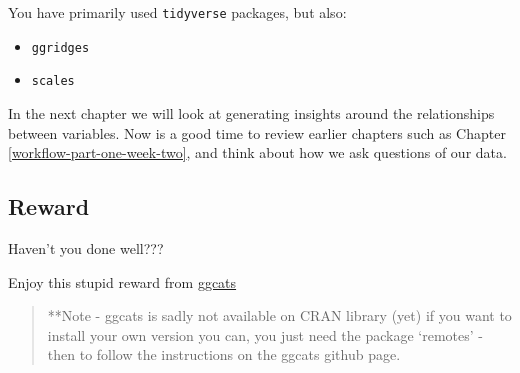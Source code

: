 \documentclass[
]{book}
\begin{document}
You have primarily used \texttt{tidyverse} packages, but also:

\begin{itemize}
\item
  \texttt{ggridges} \citet{R-ggridges}
\item
  \texttt{scales} \citet{R-scales}
\end{itemize}

In the next chapter we will look at generating insights around the relationships between variables. Now is a good time to review earlier chapters such as Chapter \ref{workflow-part-one-week-two}, and think about how we ask questions of our data.

\hypertarget{reward}{%
\subsection{Reward}\label{reward}}

Haven't you done well???

Enjoy this stupid reward from \href{https://github.com/R-CoderDotCom/ggcats}{ggcats}

\begin{quote}
**Note - ggcats is sadly not available on CRAN library (yet) if you want to install your own version you can, you just need the package `remotes' - then to follow the instructions on the ggcats github page.
\end{quote}
\end{document}
